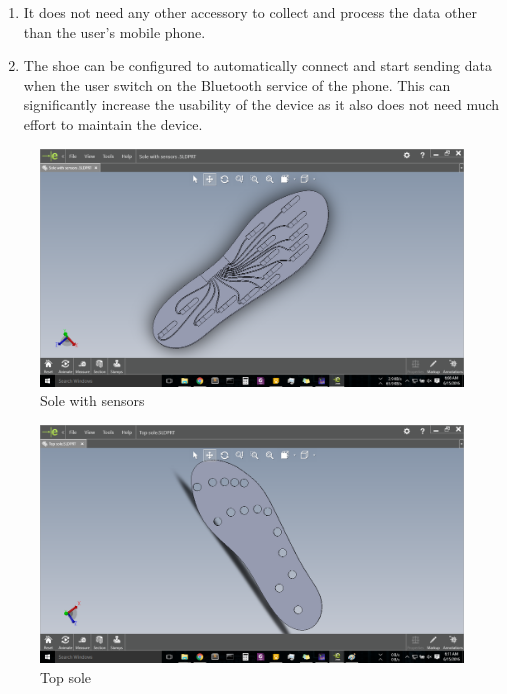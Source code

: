 \documentclass[a4paper]{report}
\begin{document}
\begin{enumerate}
		\item
		It does not need any other accessory to collect and process the data other than the user’s mobile phone.
		
		\item
		The shoe can be configured to automatically connect and start sending data when the user switch on the Bluetooth service of the phone. This can significantly increase the usability of the device as it also does not need much effort to maintain the device.
		
	\end{enumerate}
	
	\begin{figure}[H]
		\includegraphics[width = \linewidth]{sole_with_sensors}
		\caption{Sole with sensors}
		\label{fig:sole_with_sensors}
	\end{figure}
	
	\begin{figure}[H]
		\includegraphics[width = \linewidth]{top_sole}
		\caption{Top sole}
		\label{fig:top_sole}
	\end{figure}
	
\end{document}
